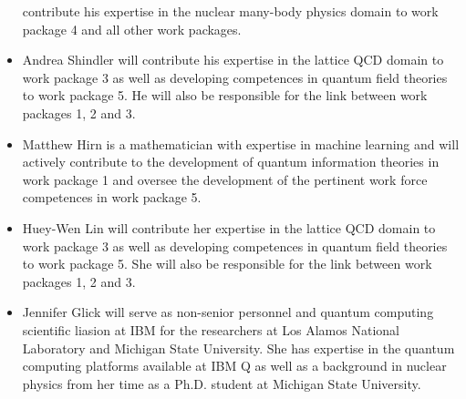 \documentclass[11pt]{article}
\begin{document}
\begin{itemize}
contribute his expertise in the nuclear many-body physics domain to work package  4 and all other work packages.
\item Andrea Shindler will
contribute his expertise in the lattice QCD domain to work package  3 as well as developing competences in quantum field theories to  work package 5. He will also be responsible for the link between work packages 1, 2 and 3. 
\item Matthew Hirn is a mathematician with expertise in machine learning and will actively contribute to the development of quantum information theories in work package 1 and oversee the development of the pertinent work force competences in work package 5.
\item Huey-Wen Lin will
contribute her expertise in the lattice QCD domain to work package  3 as well as developing competences in quantum field theories to  work package 5. She will also be responsible for the link between work packages 1, 2 and 3. 

\item Jennifer Glick will serve as non-senior personnel and quantum computing scientific liasion at IBM for the researchers at Los Alamos National Laboratory and Michigan State University.  She has expertise in the quantum computing platforms available at IBM Q as well as a background in nuclear physics from her time as a Ph.D. student at Michigan State University.

\end{itemize}
\end{document}
